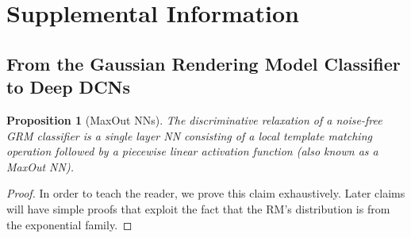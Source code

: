 \documentclass[12pt]{article}
\newtheorem{proposition}[theorem]{Proposition}
\begin{document}
\clearpage

\clearpage
\appendix

\section{Supplemental Information}\label{sec:supp}\subsection{From the Gaussian Rendering Model Classifier to Deep DCNs }\begin{proposition}[MaxOut NNs] \label{eq:GRM-MaxOutNN}
The discriminative relaxation of a noise-free GRM classifier is a single layer NN consisting of a local template matching operation followed by a piecewise linear activation function (also known as a \emph{MaxOut NN}\cite{goodfellow2013maxout}).
\end{proposition}\begin{proof}
In order to teach the reader, we prove this claim exhaustively. Later claims will have simple proofs that exploit the fact that the RM's distribution is from the exponential family.


\end{proof}
\end{document}
